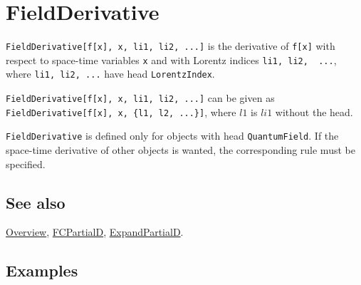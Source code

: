 \documentclass[../FeynCalcManual.tex]{subfiles}
\begin{document}
\hypertarget{fieldderivative}{
\section{FieldDerivative}\label{fieldderivative}}

\texttt{FieldDerivative[\allowbreak{}f[\allowbreak{}x],\ \allowbreak{}x,\ \allowbreak{}li1,\ \allowbreak{}li2,\ \allowbreak{}...]}
is the derivative of \texttt{f[\allowbreak{}x]} with respect to
space-time variables \texttt{x} and with Lorentz indices
\texttt{li1,\ \allowbreak{}li2,\ \allowbreak{} ...}, where
\texttt{li1,\ \allowbreak{}li2,\ \allowbreak{}...} have head
\texttt{LorentzIndex}.

\texttt{FieldDerivative[\allowbreak{}f[\allowbreak{}x],\ \allowbreak{}x,\ \allowbreak{}li1,\ \allowbreak{}li2,\ \allowbreak{}...]}
can be given as
\texttt{FieldDerivative[\allowbreak{}f[\allowbreak{}x],\ \allowbreak{}x,\ \allowbreak{}\{\allowbreak{}l1,\ \allowbreak{}l2,\ \allowbreak{}...\}]},
where \(l1\) is \(li1\) without the head.

\texttt{FieldDerivative} is defined only for objects with head
\texttt{QuantumField}. If the space-time derivative of other objects is
wanted, the corresponding rule must be specified.

\subsection{See also}

\hyperlink{toc}{Overview}, \hyperlink{fcpartiald}{FCPartialD},
\hyperlink{expandpartiald}{ExpandPartialD}.

\subsection{Examples}

\begin{Shaded}
\begin{Highlighting}[]
\OperatorTok{[}\OperatorTok{,} \OperatorTok{\{}\SpecialCharTok{\textbackslash{}}\OperatorTok{[}\OperatorTok{]\}][}\OperatorTok{]}\OperatorTok{[}\OperatorTok{,} \OperatorTok{\{}\SpecialCharTok{\textbackslash{}}\OperatorTok{[}\OperatorTok{]\}][}\OperatorTok{]}\OperatorTok{[}\OperatorTok{,} \OperatorTok{\{}\SpecialCharTok{\textbackslash{}}\OperatorTok{[}\OperatorTok{]\}][}\OperatorTok{]}\OperatorTok{[}\OperatorTok{,} \OperatorTok{\{}\SpecialCharTok{\textbackslash{}}\OperatorTok{[}\OperatorTok{]\}][}\OperatorTok{]}
\end{Highlighting}
\end{Shaded}
\end{document}
